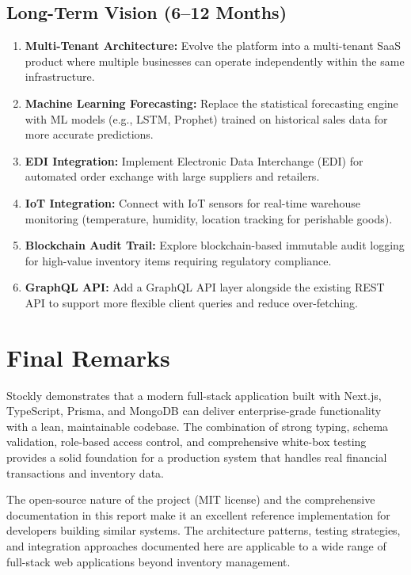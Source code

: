 ﻿\documentclass[12pt,a4paper]{report}
\begin{document}
\subsection{Long-Term Vision (6--12 Months)}

\begin{enumerate}[leftmargin=1.5em]
  \item \textbf{Multi-Tenant Architecture:} Evolve the platform into a multi-tenant SaaS product where multiple businesses can operate independently within the same infrastructure.
  \item \textbf{Machine Learning Forecasting:} Replace the statistical forecasting engine with ML models (e.g., LSTM, Prophet) trained on historical sales data for more accurate predictions.
  \item \textbf{EDI Integration:} Implement Electronic Data Interchange (EDI) for automated order exchange with large suppliers and retailers.
  \item \textbf{IoT Integration:} Connect with IoT sensors for real-time warehouse monitoring (temperature, humidity, location tracking for perishable goods).
  \item \textbf{Blockchain Audit Trail:} Explore blockchain-based immutable audit logging for high-value inventory items requiring regulatory compliance.
  \item \textbf{GraphQL API:} Add a GraphQL API layer alongside the existing REST API to support more flexible client queries and reduce over-fetching.
\end{enumerate}

\section{Final Remarks}

Stockly demonstrates that a modern full-stack application built with Next.js, TypeScript, Prisma, and MongoDB can deliver enterprise-grade functionality with a lean, maintainable codebase. The combination of strong typing, schema validation, role-based access control, and comprehensive white-box testing provides a solid foundation for a production system that handles real financial transactions and inventory data.

The open-source nature of the project (MIT license) and the comprehensive documentation in this report make it an excellent reference implementation for developers building similar systems. The architecture patterns, testing strategies, and integration approaches documented here are applicable to a wide range of full-stack web applications beyond inventory management.
\end{document}

